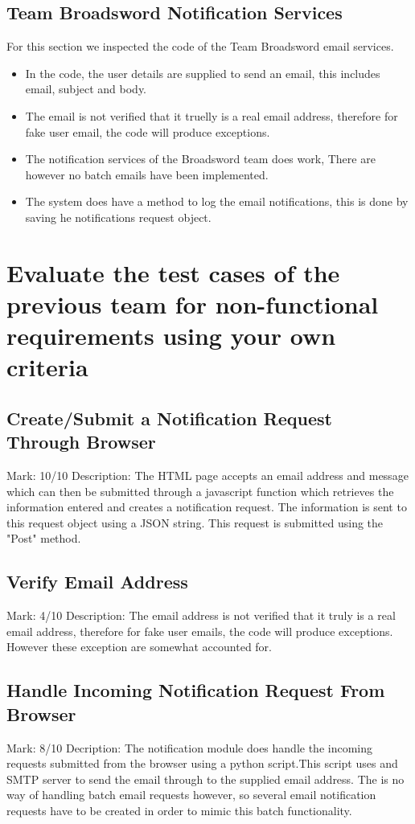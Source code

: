\documentclass[11pt]{article}
\begin{document}
	\subsection{Team Broadsword Notification Services}
	For this section we inspected the code of the Team Broadsword email services.
	\begin{itemize}
		\item In the code, the user details are supplied to send an email, this includes email, subject and body. 
		\item The email is not verified that it truelly is a real email address, therefore for fake user email, the code will produce exceptions. 
		\item The notification services of the Broadsword team does work, There are however no batch emails have been implemented.
		\item The system does have a method to log the email notifications, this is done by saving he notifications request object.  
	\end{itemize}
	
\section{Evaluate the test cases of the previous team for non-functional requirements using your own criteria}	

	\subsection{Create/Submit a Notification Request Through Browser} 
		Mark: 10/10\newline
		Description: The HTML page accepts an email address and message which can then be submitted through a javascript function which retrieves the information entered and creates a notification request. The information is sent to this request object using a JSON string. This request is submitted using the "Post" method.
		

	\subsection{Verify Email Address} 
		Mark: 4/10\newline
		Description: The email address is not verified that it truly is a real email address, therefore for fake user emails, the code will produce exceptions. However these exception are somewhat accounted for.
		

	\subsection{Handle Incoming Notification Request From Browser}
		Mark: 8/10\newline
		Decription: The notification module does handle the incoming requests submitted from the browser using a python script.This script uses and SMTP server to send the email through to the supplied email address. The is no way of handling batch email requests however, so several email notification requests have to be created in order to mimic this batch functionality.
		
\end{document}
